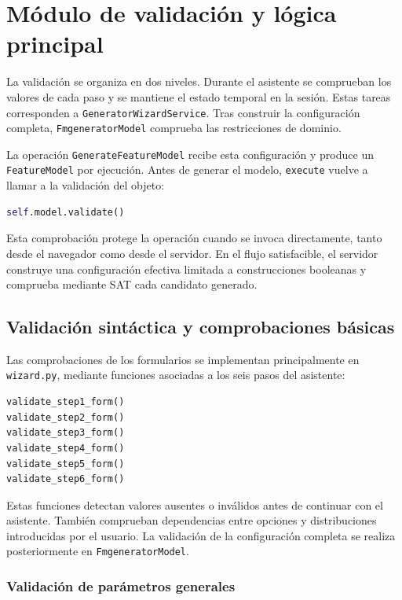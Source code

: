 \section{Módulo de validación y lógica principal}
\label{sec:modulo_principal}

La validación se organiza en dos niveles. Durante el asistente se comprueban
los valores de cada paso y se mantiene el estado temporal en la sesión. Estas
tareas corresponden a \texttt{GeneratorWizardService}. Tras construir la
configuración completa, \texttt{FmgeneratorModel} comprueba las restricciones
de dominio.

La operación \texttt{GenerateFeatureModel} recibe esta configuración y
produce un \texttt{FeatureModel} por ejecución. Antes de generar el modelo,
\texttt{execute} vuelve a llamar a la validación del objeto:

\begin{lstlisting}[language=Python]
self.model.validate()
\end{lstlisting}

Esta comprobación protege la operación cuando se invoca directamente, tanto
desde el navegador como desde el servidor. En el flujo satisfacible, el
servidor construye una configuración efectiva limitada a construcciones
booleanas y comprueba mediante SAT cada candidato generado.

\subsection{Validación sintáctica y comprobaciones básicas}
\label{subsec:validacion_sintactica}

Las comprobaciones de los formularios se implementan principalmente en
\texttt{wizard.py}, mediante funciones asociadas a los seis pasos del
asistente:

\begin{lstlisting}[language=Python]
validate_step1_form()
validate_step2_form()
validate_step3_form()
validate_step4_form()
validate_step5_form()
validate_step6_form()
\end{lstlisting}

Estas funciones detectan valores ausentes o inválidos antes de continuar con
el asistente. También comprueban dependencias entre opciones y distribuciones
introducidas por el usuario. La validación de la configuración completa se
realiza posteriormente en \texttt{FmgeneratorModel}.

\subsubsection*{Validación de parámetros generales}

